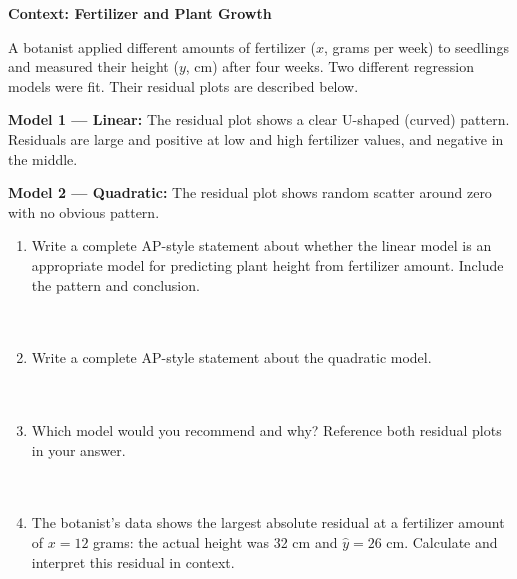 \documentclass[10pt]{article}
\begin{document}
\begin{tcolorbox}[colback=white, colframe=black!40, boxrule=0.8pt, arc=2mm,
    left=4mm, right=4mm, top=3mm, bottom=3mm,
    title={\textbf{Tier E --- Extension}}, fonttitle=\bfseries, halign title=center]
\small

\textbf{Context: Fertilizer and Plant Growth}

A botanist applied different amounts of fertilizer ($x$, grams per week) to seedlings and
measured their height ($y$, cm) after four weeks. Two different regression models were fit.
Their residual plots are described below.

\vspace{8pt}

\textbf{Model 1 --- Linear:} The residual plot shows a clear U-shaped (curved) pattern.
Residuals are large and positive at low and high fertilizer values, and negative in the middle.

\textbf{Model 2 --- Quadratic:} The residual plot shows random scatter around zero with no
obvious pattern.

\vspace{10pt}

\begin{enumerate}[leftmargin=1.6em, itemsep=0.18in]

  \item Write a complete AP-style statement about whether the linear model is an appropriate
        model for predicting plant height from fertilizer amount. Include the pattern and conclusion.\\[8pt]
        \writeline\\[3pt]\writeline\\[3pt]\writeline

  \item Write a complete AP-style statement about the quadratic model.\\[8pt]
        \writeline\\[3pt]\writeline\\[3pt]\writeline

  \item Which model would you recommend and why? Reference both residual plots in your answer.\\[8pt]
        \writeline\\[3pt]\writeline\\[3pt]\writeline

  \item The botanist's data shows the largest absolute residual at a fertilizer amount of
        $x = 12$ grams: the actual height was 32 cm and $\hat{y} = 26$ cm. Calculate and
        interpret this residual in context.\\[8pt]
        \writeline\\[3pt]\writeline

\end{enumerate}
\end{tcolorbox}
\end{document}
